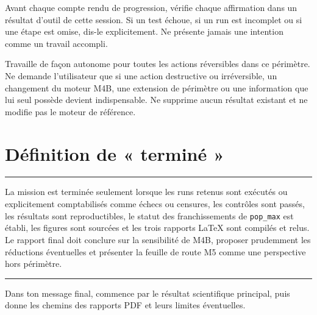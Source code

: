 \documentclass[11pt,a4paper]{article}
\newcommand{\code}[1]{\texttt{\color{navy}#1}}
\newenvironment{briefbox}
  {\begin{center}\begin{minipage}{0.94\textwidth}\color{navy}\hrule\vspace{0.7em}}
  {\vspace{0.5em}\hrule\end{minipage}\end{center}}
\begin{document}
Avant chaque compte rendu de progression, vérifie chaque affirmation dans un
résultat d'outil de cette session. Si un test échoue, si un run est incomplet ou
si une étape est omise, dis-le explicitement. Ne présente jamais une intention
comme un travail accompli.

Travaille de façon autonome pour toutes les actions réversibles dans ce
périmètre. Ne demande l'utilisateur que si une action destructive ou
irréversible, un changement du moteur M4B, une extension de périmètre ou une
information que lui seul possède devient indispensable. Ne supprime aucun
résultat existant et ne modifie pas le moteur de référence.

\section{Définition de « terminé »}

\begin{briefbox}
La mission est terminée seulement lorsque les runs retenus sont exécutés ou
explicitement comptabilisés comme échecs ou censures, les contrôles sont
passés, les résultats sont reproductibles, le statut des franchissements de
\code{pop\_max} est établi, les figures sont sourcées et les trois rapports
LaTeX sont compilés et relus. Le rapport final doit conclure sur la sensibilité
de M4B, proposer prudemment les réductions éventuelles et présenter la feuille
de route M5 comme une perspective hors périmètre.
\end{briefbox}

Dans ton message final, commence par le résultat scientifique principal, puis
donne les chemins des rapports PDF et leurs limites éventuelles.
\end{document}
